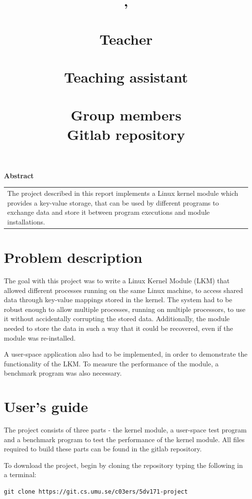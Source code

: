 \documentclass[final,a4paper]{article}
\title{
  \pagenumbering{gobble}
  \begin{center}
  \vspace{4em}
  {\LARGE \bf \course{}, \semester}\\
  {\Large \bf \assignment}\\
  \vspace{4em}
  {\normalsize
  {\bf Teacher}\\
  {\lecturer}\vspace{1em}\\
  {\bf Teaching assistant}\\
  {\assistants}\vspace{1em}\\
  {\bf Group members}\\
  \authors
  {\bf Gitlab repository}\vspace{-1em}\\
  {\codebase}}
  \end{center}
  \vspace{2em}
}
\author{}
\date{}
\newcommand{\codebase}{https://git.cs.umu.se/c03ers/5dv171-project}
\begin{document}
\maketitle
  \begin{center}
  {\bf Abstract }\\
  \vspace{0.5em}
  \begin{tabular}{ p{25em} }
  \hline
  \vspace{0.0em}
  The project described in this report implements a Linux kernel module
  which provides a key-value storage, that can be used by different programs
  to exchange data and store it between program executions and module
  installations.\vspace{0.7em}\\
  \end{tabular}
  \end{center}
\pagebreak
\tableofcontents
\newpage
{}
\section{Problem description}
The goal with this project was to write a Linux Kernel Module (LKM) that allowed
different processes running on the same Linux machine, to access shared data
through key-value mappings stored in the kernel. The system had to be robust
enough to allow multiple processes, running on multiple processors, to use it
without accidentally corrupting the stored data. Additionally, the module
needed to store the data in such a way that it could be recovered, even if the
module was re-installed.

A user-space application also had to be implemented, in order  to demonstrate
the functionality of the LKM. To measure the performance of the module, a
benchmark program was also necessary.

\section{User's guide}
The project consists of three parts - the kernel module, a user-space
test program and a benchmark program to test the performance of the kernel
module. All files required to build these parts can be found in the gitlab
repository.

To download the project, begin by cloning the repository typing the following in
a terminal:
\begin{center}
{\tt git clone \codebase}
\end{center}
\end{document}
